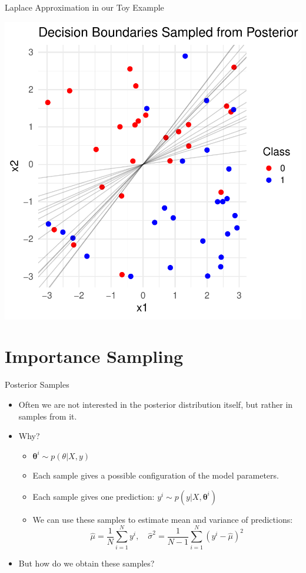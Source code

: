 \documentclass{beamer}
\begin{document}
\begin{frame}{Laplace Approximation in our Toy Example}

\begin{center}
  \includegraphics[width=0.6\linewidth]{figures/laplace_decision_boundaries.pdf}
\end{center}

\end{frame}

\section{Importance Sampling}

\begin{frame}{Posterior Samples}
\begin{itemize}
\item Often we are not interested in the posterior distribution itself, but rather in samples from it.
\item Why?
  \begin{itemize}
  \item \( \boldsymbol{\theta}^i \sim p(\theta | X, y) \)
  \item Each sample gives a possible configuration of the model parameters.
  \item Each sample gives one prediction: \( y^i \sim p(y | X, \boldsymbol{\theta}^i) \)
  \item We can use these samples to estimate mean and variance of predictions:
    \[
      \hat{\mu} = \frac{1}{N} \sum_{i=1}^N y^i, \quad \hat{\sigma}^2 = \frac{1}{N-1} \sum_{i=1}^N (y^i - \hat{\mu})^2
    \]
  \end{itemize}
\item But how do we obtain these samples?
\end{itemize}
\end{frame}
\end{document}
